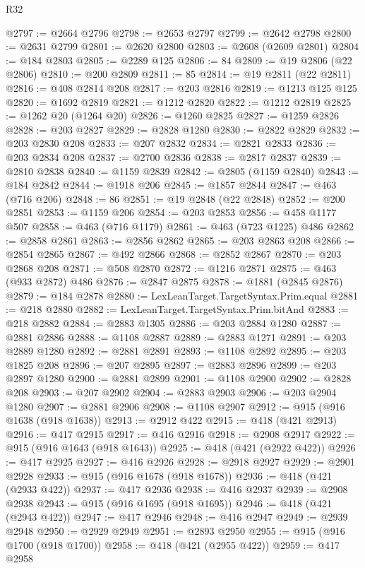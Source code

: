 \begin{lexlean}{R32}
\begin{coremodule}
@2797 := @2664 @2796
@2798 := @2653 @2797
@2799 := @2642 @2798
@2800 := @2631 @2799
@2801 := @2620 @2800
@2803 := @2608 (@2609 @2801)
@2804 := @184 @2803
@2805 := @2289 @125
@2806 := 84
@2809 := @19 @2806 (@22 @2806)
@2810 := @200 @2809
@2811 := 85
@2814 := @19 @2811 (@22 @2811)
@2816 := @408 @2814 @208
@2817 := @203 @2816
@2819 := @1213 @125 @125
@2820 := @1692 @2819
@2821 := @1212 @2820
@2822 := @1212 @2819
@2825 := @1262 @20 (@1264 @20)
@2826 := @1260 @2825
@2827 := @1259 @2826
@2828 := @203 @2827
@2829 := @2828 @1280
@2830 := @2822 @2829
@2832 := @203 @2830 @208
@2833 := @207 @2832
@2834 := @2821 @2833
@2836 := @203 @2834 @208
@2837 := @2700 @2836
@2838 := @2817 @2837
@2839 := @2810 @2838
@2840 := @1159 @2839
@2842 := @2805 (@1159 @2840)
@2843 := @184 @2842
@2844 := @1918 @206
@2845 := @1857 @2844
@2847 := @463 (@716 @206)
@2848 := 86
@2851 := @19 @2848 (@22 @2848)
@2852 := @200 @2851
@2853 := @1159 @206
@2854 := @203 @2853
@2856 := @458 @1177 @507
@2858 := @463 (@716 @1179)
@2861 := @463 (@723 @1225) @486
@2862 := @2858 @2861
@2863 := @2856 @2862
@2865 := @203 @2863 @208
@2866 := @2854 @2865
@2867 := @492 @2866
@2868 := @2852 @2867
@2870 := @203 @2868 @208
@2871 := @508 @2870
@2872 := @1216 @2871
@2875 := @463 (@933 @2872) @486
@2876 := @2847 @2875
@2878 := @1881 (@2845 @2876)
@2879 := @184 @2878
@2880 := LexLeanTarget.TargetSyntax.Prim.equal
@2881 := @218 @2880
@2882 := LexLeanTarget.TargetSyntax.Prim.bitAnd
@2883 := @218 @2882
@2884 := @2883 @1305
@2886 := @203 @2884 @1280
@2887 := @2881 @2886
@2888 := @1108 @2887
@2889 := @2883 @1271
@2891 := @203 @2889 @1280
@2892 := @2881 @2891
@2893 := @1108 @2892
@2895 := @203 @1825 @208
@2896 := @207 @2895
@2897 := @2883 @2896
@2899 := @203 @2897 @1280
@2900 := @2881 @2899
@2901 := @1108 @2900
@2902 := @2828 @208
@2903 := @207 @2902
@2904 := @2883 @2903
@2906 := @203 @2904 @1280
@2907 := @2881 @2906
@2908 := @1108 @2907
@2912 := @915 (@916 @1638 (@918 @1638))
@2913 := @2912 @422
@2915 := @418 (@421 @2913)
@2916 := @417 @2915
@2917 := @416 @2916
@2918 := @2908 @2917
@2922 := @915 (@916 @1643 (@918 @1643))
@2925 := @418 (@421 (@2922 @422))
@2926 := @417 @2925
@2927 := @416 @2926
@2928 := @2918 @2927
@2929 := @2901 @2928
@2933 := @915 (@916 @1678 (@918 @1678))
@2936 := @418 (@421 (@2933 @422))
@2937 := @417 @2936
@2938 := @416 @2937
@2939 := @2908 @2938
@2943 := @915 (@916 @1695 (@918 @1695))
@2946 := @418 (@421 (@2943 @422))
@2947 := @417 @2946
@2948 := @416 @2947
@2949 := @2939 @2948
@2950 := @2929 @2949
@2951 := @2893 @2950
@2955 := @915 (@916 @1700 (@918 @1700))
@2958 := @418 (@421 (@2955 @422))
@2959 := @417 @2958

\end{coremodule}
\end{lexlean}
